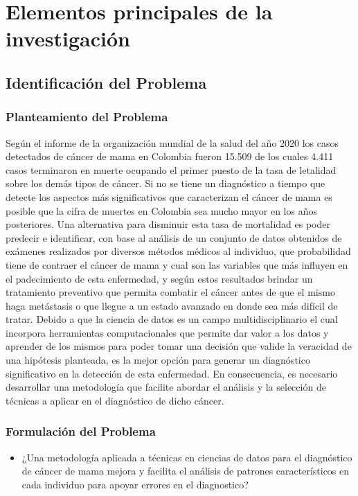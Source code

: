 \chapter{Elementos principales de la investigación}
\section{Identificación del Problema}
\subsection{Planteamiento del Problema}
Según el informe de la organización mundial de la salud del año 2020 los casos detectados de cáncer de mama en Colombia fueron 15.509 de los cuales 4.411 casos terminaron en muerte ocupando el primer puesto de la tasa de letalidad sobre los demás tipos de cáncer\cite{InternationalAgencyforResearchonCancer2020}. Si no se tiene un diagnóstico a tiempo que detecte los aspectos más significativos que caracterizan el cáncer de mama es posible que la cifra de muertes en Colombia sea mucho mayor en los años posteriores. Una alternativa para disminuir esta tasa de mortalidad es poder predecir e identificar, con base al análisis de un conjunto de datos obtenidos de exámenes realizados por diversos métodos médicos al individuo, que probabilidad tiene de contraer el cáncer de mama y cual son las variables que más influyen en el padecimiento de esta enfermedad,  y según estos resultados brindar un tratamiento preventivo que permita combatir el cáncer antes de que el mismo haga metástasis o que llegue a un estado avanzado en donde sea más difícil de tratar. Debido a que la ciencia de datos es un campo multidisciplinario el cual incorpora herramientas computacionales que permite dar valor a los datos y aprender de los mismos para poder tomar una decisión que valide la veracidad de una hipótesis planteada, es la mejor opción para generar un diagnóstico significativo en la detección de esta enfermedad. En consecuencia, es necesario desarrollar una metodología que facilite abordar el análisis y la selección de técnicas a aplicar en el diagnóstico de dicho cáncer.

\subsection{Formulación del Problema}

\begin{itemize}
	\item ¿Una metodología aplicada a técnicas en ciencias de datos para el diagnóstico de cáncer de mama mejora y facilita el análisis de patrones característicos en cada individuo para apoyar errores en el diagnostico? 
\end{itemize}

